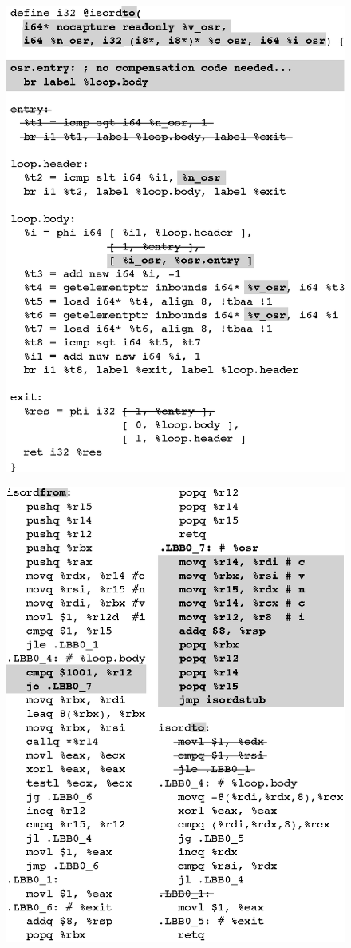 \ifdefined\noauthorea
\begin{figure}[t]
\begin{center}
\includegraphics[width=0.66\columnwidth]{figures/osr-isordto/osr-isordto.eps}
\caption{\protect}
\end{center}
\end{figure}
\fi

\ifdefined\noauthorea
\begin{figure}[t]
\begin{center}
\includegraphics[width=0.66\columnwidth]{figures/osr-isord-x86_64/osr-isord-x86_64.eps}
\caption{\protect}
\end{center}
\end{figure}
\fi

